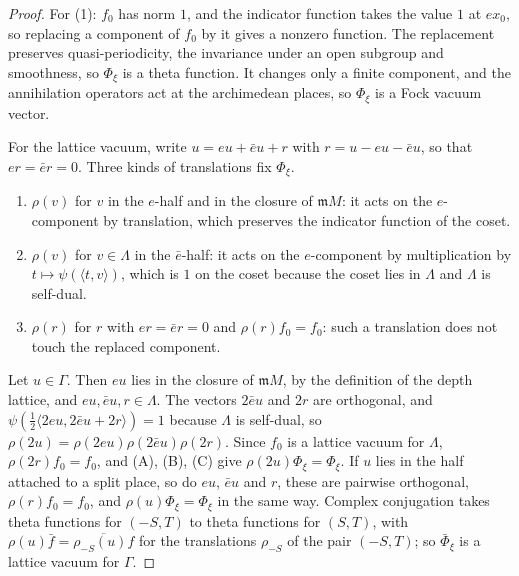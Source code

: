 \begin{proof}
For (1): $f_0$ has norm $1$, and the indicator function takes the value $1$ at
$ex_0$, so replacing a component of $f_0$ by it gives a nonzero function. The
replacement preserves quasi-periodicity, the invariance under an open subgroup
and smoothness, so $\Phi_\xi$ is a theta function. It changes only a finite
component, and the annihilation operators act at the archimedean places, so
$\Phi_\xi$ is a Fock vacuum vector.

For the lattice vacuum, write $u=eu+\bar eu+r$ with $r=u-eu-\bar eu$, so that
$er=\bar er=0$. Three kinds of translations fix $\Phi_\xi$.
\begin{enumerate}
\item[(A)] $\rho(v)$ for $v$ in the $e$-half and in the closure of
  $\mathfrak mM$: it acts on the $e$-component by translation, which preserves
  the indicator function of the coset.
\item[(B)] $\rho(v)$ for $v\in\Lambda$ in the $\bar e$-half: it acts on the
  $e$-component by multiplication by $t\mapsto\psi(\langle t,v\rangle)$, which
  is $1$ on the coset because the coset lies in $\Lambda$ and $\Lambda$ is
  self-dual.
\item[(C)] $\rho(r)$ for $r$ with $er=\bar er=0$ and $\rho(r)f_0=f_0$: such a
  translation does not touch the replaced component.
\end{enumerate}
Let $u\in\Gamma$. Then $eu$ lies in the closure of $\mathfrak mM$, by the
definition of the depth lattice, and $eu,\bar eu,r\in\Lambda$. The vectors
$2\bar eu$ and $2r$ are orthogonal, and $\psi(\tfrac12\langle2eu,2\bar eu+2r\rangle)=1$
because $\Lambda$ is self-dual, so
$\rho(2u)=\rho(2eu)\rho(2\bar eu)\rho(2r)$. Since $f_0$ is a lattice vacuum for
$\Lambda$, $\rho(2r)f_0=f_0$, and (A), (B), (C) give $\rho(2u)\Phi_\xi=\Phi_\xi$.
If $u$ lies in the half attached to a split place, so do $eu$, $\bar eu$ and
$r$, these are pairwise orthogonal, $\rho(r)f_0=f_0$, and
$\rho(u)\Phi_\xi=\Phi_\xi$ in the same way. Complex conjugation takes theta
functions for $(-S,T)$ to theta functions for $(S,T)$, with
$\rho(u)\bar f=\overline{\rho_{-S}(u)f}$ for the translations $\rho_{-S}$ of
the pair $(-S,T)$; so $\bar\Phi_\xi$ is a lattice vacuum for $\Gamma$.


\end{proof}
